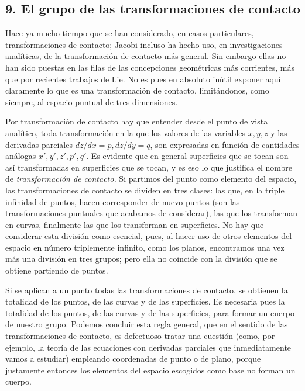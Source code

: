\documentclass[a4paper, 12pt]{article}
\begin{document}
\subsection*{9. El grupo de las transformaciones de contacto} 



Hace ya mucho tiempo que se han considerado, en casos particulares, transformaciones de contacto; Jacobi incluso ha hecho uso, en investigaciones analíticas, de la transformación de contacto más general. Sin embargo ellas no han sido puestas en las filas de las concepciones geométricas más corrientes, más que por recientes trabajos de Lie. No es pues en absoluto inútil exponer aquí claramente lo que es una transformación de contacto, limitándonos, como siempre, al espacio puntual de tres dimensiones.

Por transformación de contacto hay que entender desde el punto de vista analítico, toda transformación en la que los valores de las variables $x, y, z$ y las derivadas parciales $dz/dx = p, dz/dy = q$, son expresadas en función de cantidades análogas $x',y',z',p',q'$. Es evidente que en general superficies que se tocan son así transformadas en superficies que se tocan, y es eso lo que justifica el nombre de \textit{transformación de contacto.} Si partimos del punto como elemento del espacio, las transformaciones de contacto se dividen en tres clases: las que, en la triple infinidad de puntos, hacen corresponder de nuevo puntos (son las transformaciones puntuales que acabamos de considerar), las que los transforman en curvas, finalmente las que los transforman en superficies. No hay que considerar esta división como esencial, pues, al hacer uso de otros elementos del espacio en número triplemente infinito, como los planos, encontramos una vez más una división en tres grupos; pero ella no coincide con la división que se obtiene partiendo de puntos.

Si se aplican a un punto todas las transformaciones de contacto, se obtienen la totalidad de los puntos, de las curvas y de las superficies. Es necesaria pues la totalidad de los puntos, de las curvas y de las superficies, para formar un cuerpo de nuestro grupo. Podemos concluir esta regla general, que en el sentido de las transformaciones de contacto, es defectuoso tratar una cuestión (como, por ejemplo, la teoría de las ecuaciones con derivadas parciales que inmediatamente vamos a estudiar) empleando coordenadas de punto o de plano, porque justamente entonces los elementos del espacio escogidos como base no forman un cuerpo.
\end{document}
